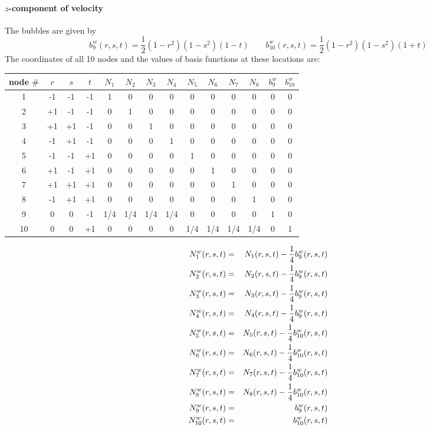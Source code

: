 \paragraph{$z$-component of velocity} 



The bubbles are given by 
\[
b_9^w(r,s,t)=\frac{1}{2}(1-r^2)(1-s^2)(1-t)
\qquad
b_{10}^w(r,s,t)=\frac{1}{2}(1-r^2)(1-s^2)(1+t)
\]
The coordinates of all 10 nodes and the values of basis functions at these locations are:
\begin{center}
\begin{tabular}{c|ccc|cccccccc|cc}
\hline
node $\#$  & $r$ & $s$ & $t$ & $N_1$ & $N_2$ & $N_3$ & $N_4$ & $N_5$ & $N_6$ & $N_7$ & $N_8$ & $b_9^w$ & $b_{10}^w$\\
\hline\hline
1 & -1 & -1 & -1 & 1 & 0 & 0 & 0 & 0 & 0 & 0 & 0 & 0 & 0\\
2 & +1 & -1 & -1 & 0 & 1 & 0 & 0 & 0 & 0 & 0 & 0 & 0 & 0\\
3 & +1 & +1 & -1 & 0 & 0 & 1 & 0 & 0 & 0 & 0 & 0 & 0 & 0\\
4 & -1 & +1 & -1 & 0 & 0 & 0 & 1 & 0 & 0 & 0 & 0 & 0 & 0\\
5 & -1 & -1 & +1 & 0 & 0 & 0 & 0 & 1 & 0 & 0 & 0 & 0 & 0\\
6 & +1 & -1 & +1 & 0 & 0 & 0 & 0 & 0 & 1 & 0 & 0 & 0 & 0\\
7 & +1 & +1 & +1 & 0 & 0 & 0 & 0 & 0 & 0 & 1 & 0 & 0 & 0\\
8 & -1 & +1 & +1 & 0 & 0 & 0 & 0 & 0 & 0 & 0 & 1 & 0 & 0\\
9 &  0 &  0 & -1 & 1/4 & 1/4 & 1/4 & 1/4 & 0 & 0 & 0 & 0&  1& 0\\
10&  0 &  0 & +1 & 0 & 0 &0 & 0 & 1/4 & 1/4  & 1/4 & 1/4 & 0& 1\\
\hline
\end{tabular}
\end{center}


\begin{mdframed}[backgroundcolor=blue!5]
\begin{eqnarray}
{N}_1^w(r,s,t) &=&  N_1(r,s,t) - \frac{1}{4} b_9^w(r,s,t)\nonumber\\
{N}_2^w(r,s,t) &=&  N_2(r,s,t) - \frac{1}{4} b_9^w(r,s,t)\nonumber\\
{N}_3^w(r,s,t) &=&  N_3(r,s,t) - \frac{1}{4} b_9^w(r,s,t)\nonumber\\
{N}_4^w(r,s,t) &=&  N_4(r,s,t) - \frac{1}{4} b_9^w(r,s,t)\nonumber\\
{N}_5^w(r,s,t) &=&  N_5(r,s,t) - \frac{1}{4} b_{10}^w(r,s,t)\nonumber\\
{N}_6^w(r,s,t) &=&  N_6(r,s,t) - \frac{1}{4} b_{10}^w(r,s,t)\nonumber\\
{N}_7^w(r,s,t) &=&  N_7(r,s,t) - \frac{1}{4} b_{10}^w(r,s,t)\nonumber\\
{N}_8^w(r,s,t) &=&  N_8(r,s,t) - \frac{1}{4} b_{10}^w(r,s,t)\nonumber\\
{N}_9^w(r,s,t) &=&  b_9^w(r,s,t)\nonumber\\
{N}_{10}^w(r,s,t) &=&  b_{10}^w(r,s,t) \nonumber
\end{eqnarray}
\end{mdframed}


